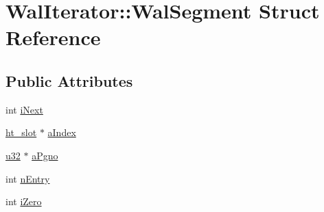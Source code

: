 \hypertarget{struct_wal_iterator_1_1_wal_segment}{\section{Wal\-Iterator\-:\-:Wal\-Segment Struct Reference}
\label{struct_wal_iterator_1_1_wal_segment}
}
\subsection*{Public Attributes}
\begin{DoxyCompactItemize}
\item 
int \hyperlink{struct_wal_iterator_1_1_wal_segment_a329c939b196f907fe98cf762bb07d291}{i\-Next}
\item 
\hyperlink{sqlite3_8c_ad66c3d273a53aab13bb1bc02f2d9e990}{ht\-\_\-slot} $\ast$ \hyperlink{struct_wal_iterator_1_1_wal_segment_adec397836a127acafcc551cb1fdcd851}{a\-Index}
\item 
\hyperlink{sqlite3_8c_a03ad5adfaeb9b7640dde78a0cc390319}{u32} $\ast$ \hyperlink{struct_wal_iterator_1_1_wal_segment_a5e43273a11dc5856934834c0cdf7f198}{a\-Pgno}
\item 
int \hyperlink{struct_wal_iterator_1_1_wal_segment_ad80cf479aa670eda7aa1adee607af7d9}{n\-Entry}
\item 
int \hyperlink{struct_wal_iterator_1_1_wal_segment_a3eedec5e8e8dd94be670d50ac144a959}{i\-Zero}
\end{DoxyCompactItemize}


